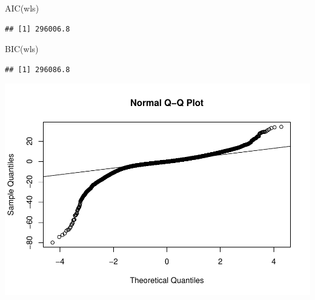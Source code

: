 \documentclass[
]{book}
\newenvironment{Shaded}{\begin{snugshade}}{\end{snugshade}}
\newcommand{\FunctionTok}[1]{\textcolor[rgb]{0.00,0.00,0.00}{#1}}
\newcommand{\NormalTok}[1]{#1}
\newcommand{\SpecialCharTok}[1]{\textcolor[rgb]{0.00,0.00,0.00}{#1}}
\begin{document}
\begin{Shaded}
\begin{Highlighting}[]
\FunctionTok{AIC}\NormalTok{(wls)}
\end{Highlighting}
\end{Shaded}

\begin{verbatim}
## [1] 296006.8
\end{verbatim}

\begin{Shaded}
\begin{Highlighting}[]
\FunctionTok{BIC}\NormalTok{(wls)}
\end{Highlighting}
\end{Shaded}

\begin{verbatim}
## [1] 296086.8
\end{verbatim}

\begin{Shaded}
\end{Shaded}

\includegraphics{13-MultipleLinearRegression_files/figure-latex/unnamed-chunk-10-1.pdf}

\begin{Shaded}
\end{Shaded}
\end{document}
